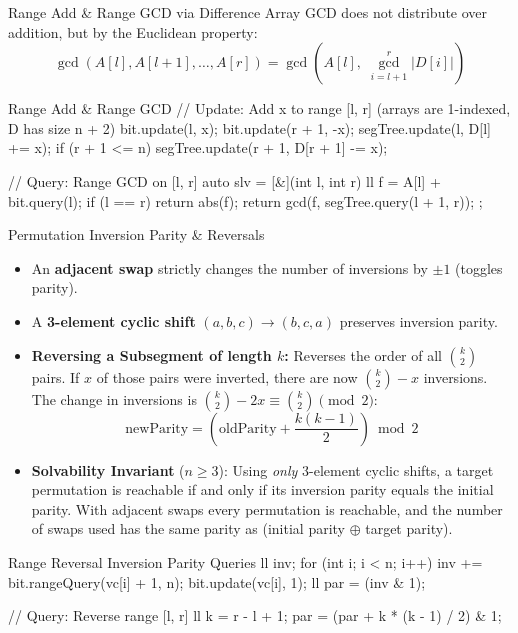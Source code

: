 \documentclass[10pt]{article}
\newcommand{\complexity}[1]{%
  \tcbox[on line,
    colback=tagbg,
    colframe=tagbg,
    boxrule=0pt,
    arc=2pt,
    boxsep=0pt,
    left=3.5pt, right=3.5pt, top=1.5pt, bottom=1.5pt
  ]{\color{tagtext}\scriptsize\bfseries\ensuremath{#1}}%
}
\begin{document}
\begin{conceptbox}{Range Add \& Range GCD via Difference Array}
    GCD does not distribute over addition, but by the Euclidean property:
    \[ \gcd(A[l], A[l+1], \dots, A[r]) = \gcd\left( A[l], \; \gcd_{i=l+1}^r |D[i]| \right) \]
\end{conceptbox}

\begin{vscode}{Range Add \& Range GCD \complexity{O(\log N \log(\max A))}}
// Update: Add x to range [l, r]  (arrays are 1-indexed, D has size n + 2)
bit.update(l, x);
bit.update(r + 1, -x);
segTree.update(l, D[l] += x);
if (r + 1 <= n)
    segTree.update(r + 1, D[r + 1] -= x);

// Query: Range GCD on [l, r]
auto slv = [&](int l, int r)
{
    ll f = A[l] + bit.query(l);
    if (l == r)
        return abs(f);
    return gcd(f, segTree.query(l + 1, r));
};
\end{vscode}


\begin{conceptbox}{Permutation Inversion Parity \& Reversals}
    \begin{itemize}
        \item An \textbf{adjacent swap} strictly changes the number of inversions by $\pm 1$ (toggles parity).
        \item A \textbf{3-element cyclic shift} $(a, b, c) \to (b, c, a)$ preserves inversion parity.
        \item \textbf{Reversing a Subsegment of length $k$:} Reverses the order of all $\binom{k}{2}$ pairs. If $x$ of those pairs were inverted, there are now $\binom{k}{2} - x$ inversions. The change in inversions is $\binom{k}{2} - 2x \equiv \binom{k}{2} \pmod 2$:
        \[ \text{newParity} = \left( \text{oldParity} + \frac{k(k - 1)}{2} \right) \bmod 2 \]
        \item \textbf{Solvability Invariant} ($n \ge 3$): Using \emph{only} 3-element cyclic shifts, a target permutation is reachable if and only if its inversion parity equals the initial parity. With adjacent swaps every permutation is reachable, and the number of swaps used has the same parity as (initial parity $\oplus$ target parity).
    \end{itemize}
\end{conceptbox}

\begin{vscode}{Range Reversal Inversion Parity Queries \complexity{O(N \log N + Q)}}
ll inv{};
for (int i{}; i < n; i++)
{
    inv += bit.rangeQuery(vc[i] + 1, n);
    bit.update(vc[i], 1);
}
ll par = (inv & 1);

// Query: Reverse range [l, r]
ll k = r - l + 1;
par = (par + k * (k - 1) / 2) & 1;
\end{vscode}
\end{document}
